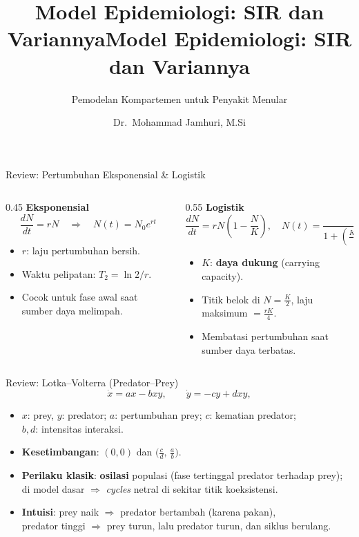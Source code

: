\documentclass[aspectratio=32]{beamer}
\title{Model Epidemiologi: SIR dan Variannya}
\subtitle{Pemodelan Kompartemen untuk Penyakit Menular}
\title{Model Epidemiologi: SIR dan Variannya}
\author[Mohammad Jamhuri]{Dr.~Mohammad Jamhuri, M.Si}
\institute[]{Prodi Matematika FSAINTEK -- UIN Maulana Malik Ibrahim, Malang}
\date{}
\newcommand{\jsg}[1]{\textcolor{teal!60!black}{\textbf{#1}}}
\begin{document}
\begin{frame}
  \titlepage
\end{frame}

\begin{frame}{Review: Pertumbuhan Eksponensial \& Logistik}
\small
\begin{columns}[T,totalwidth=\textwidth]
  \begin{column}{0.45\textwidth}
    \textbf{Eksponensial}\\[2pt]
    \[
      \frac{dN}{dt} = rN
      \quad\Rightarrow\quad
      N(t)=N_0 e^{rt}
    \]
    \begin{itemize}
      \item $r$: laju pertumbuhan bersih.
      \item Waktu pelipatan: $T_2=\ln 2 / r$.
      \item Cocok untuk fase awal saat sumber daya melimpah.
    \end{itemize}
  \end{column}
  \begin{column}{0.55\textwidth}
    \textbf{Logistik}\\[2pt]
    \[
      \frac{dN}{dt} = rN\!\left(1-\frac{N}{K}\right),
      \quad
      N(t)=\frac{K}{1+\left(\frac{K-N_0}{N_0}\right)e^{-rt}}
    \]
    \begin{itemize}
      \item $K$: \jsg{daya dukung} (carrying capacity).
      \item Titik belok di $N=\tfrac{K}{2}$, laju maksimum $=\tfrac{rK}{4}$.
      \item Membatasi pertumbuhan saat sumber daya terbatas.
    \end{itemize}
  \end{column}
\end{columns}
\end{frame}

\begin{frame}{Review: Lotka--Volterra (Predator--Prey)}
\small
\[
\dot{x} = a x - b x y,
\qquad
\dot{y} = -c y + d x y,
\]
\begin{itemize}
  \item $x$: prey, $y$: predator;\; $a$: pertumbuhan prey;\; $c$: kematian predator;\\
        $b,d$: intensitas interaksi.
  \item \textbf{Kesetimbangan}: $(0,0)$ dan $\big(\tfrac{c}{d},\,\tfrac{a}{b}\big)$.
  \item \textbf{Perilaku klasik}: \jsg{osilasi} populasi (fase tertinggal predator terhadap prey);\\
        di model dasar $\Rightarrow$ \textit{cycles} netral di sekitar titik koeksistensi.
  \item \textbf{Intuisi}: prey naik $\Rightarrow$ predator bertambah (karena pakan),\\
        predator tinggi $\Rightarrow$ prey turun, lalu predator turun, dan siklus berulang.
\end{itemize}
\end{frame}
\end{document}
